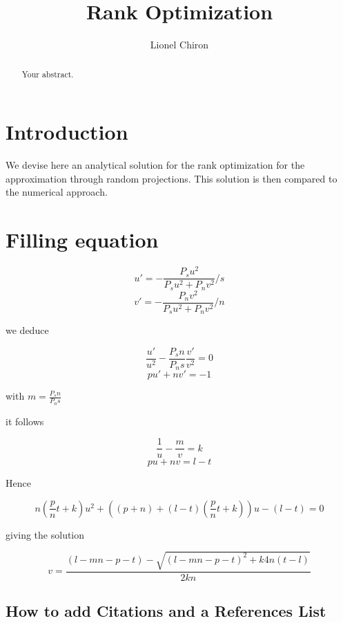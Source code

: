 \documentclass[a4paper]{article}
\title{Rank Optimization}
\author{Lionel Chiron}
\begin{document}
\maketitle

\begin{abstract}
Your abstract.
\end{abstract}

\section{Introduction}

We devise here an analytical solution for the rank optimization for the approximation through random projections.
This solution is then compared to the numerical approach.

\section{Filling equation}

\begin{equation}
      u'= -\frac{P_su^2}{P_su^2+P_nv^2}/s
\end{equation}
\begin{equation}
      v'= -\frac{P_nv^2}{P_su^2+P_nv^2}/n
\end{equation}

we deduce

\begin{equation}
    \frac{u'}{u^2} - \frac{P_sn}{P_ns} \frac{v'}{v^2}= 0
\end{equation}
\begin{equation}
    p u'+n v' = -1
\end{equation}

with $ m = \frac{P_sn}{P_ns} $

it follows

\begin{equation}
    \frac{1}{u} - \frac{m}{v} = k
\end{equation}
\begin{equation}
    p u+n v = l-t
\end{equation}

Hence

\begin{equation}
    n(\frac{p}{n}t+k)u^2+((p+n)+(l-t)(\frac{p}{n}t+k))u-(l-t) = 0
\end{equation}

giving the solution

\begin{equation}
    v = \frac{(l-mn-p-t)-\sqrt{(l-mn-p-t)^2+k4n(t-l)}}{2kn}
\end{equation}

\subsection{How to add Citations and a References List}




\end{document}
